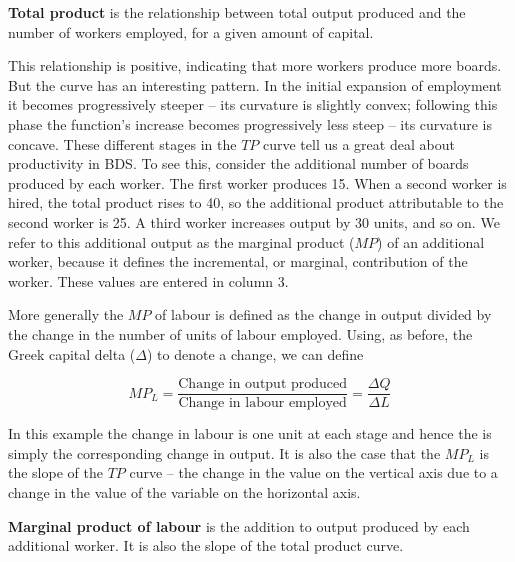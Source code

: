 

\begin{DefBox}
	\textbf{Total product} is the relationship between total output produced and the number of workers employed, for a given amount of capital.
\end{DefBox}

\newhtmlpage

This relationship is positive, indicating that more workers produce more
boards. But the curve has an interesting pattern. In the initial expansion
of employment it becomes progressively steeper -- its curvature is slightly
convex; following this phase the function's increase becomes progressively
less steep -- its curvature is concave. These different stages in the $TP$
curve tell us a great deal about productivity in BDS. To see this, consider
the additional number of boards produced by each worker. The first worker
produces 15. When a second worker is hired, the total product rises to 40,
so the additional product attributable to the second worker is 25. A third
worker increases output by 30 units, and so on. We refer to this additional
output as the marginal product ($MP$) of an additional worker, because it
defines the incremental, or marginal, contribution of the worker. These
values are entered in column 3.

More generally the $MP$ of labour is defined as the change in output divided
by the change in the number of units of labour employed. Using, as before,
the Greek capital delta ($\Delta$) to denote a change, we can define

\begin{equation*}
MP_{L}=\frac{\text{Change in output produced}}{\text{Change in labour employed}}=\frac{\Delta Q}{\Delta L}
\end{equation*}

In this example the change in labour is one unit at each stage and hence the %
 is simply the corresponding change
in output. It is also the case that the $MP_L$ is the slope of the $TP$
curve -- the change in the value on the vertical axis due to a change in the
value of the variable on the horizontal axis.

\begin{DefBox}
	\textbf{Marginal product of labour} is the addition to output produced by each additional worker. It is also the slope of the total product curve.
\end{DefBox}

